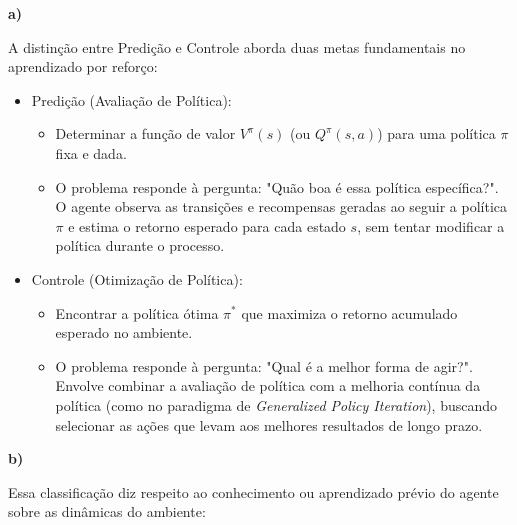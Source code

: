 \documentclass[a4paper,12pt]{article}
\begin{document}
\textbf{a)}


A distinção entre Predição e Controle aborda duas metas fundamentais no aprendizado por reforço:

\begin{itemize}
	\item Predição (Avaliação de Política):
	\begin{itemize}
		\item Determinar a função de valor $V^\pi(s)$ (ou $Q^\pi(s,a)$) para uma política $\pi$ fixa e dada.
		\item O problema responde à pergunta: "Quão boa é essa política específica?". O agente observa as transições e recompensas geradas ao seguir a política $\pi$ e estima o retorno esperado para cada estado $s$, sem tentar modificar a política durante o processo.
	\end{itemize}
	
	\item Controle (Otimização de Política):
	\begin{itemize}
		\item Encontrar a política ótima $\pi^*$ que maximiza o retorno acumulado esperado no ambiente.
		\item O problema responde à pergunta: "Qual é a melhor forma de agir?". Envolve combinar a avaliação de política com a melhoria contínua da política (como no paradigma de \textit{Generalized Policy Iteration}), buscando selecionar as ações que levam aos melhores resultados de longo prazo.\\
	\end{itemize}
\end{itemize}



\textbf{b)} 

Essa classificação diz respeito ao conhecimento ou aprendizado prévio do agente sobre as dinâmicas do ambiente:
\end{document}
